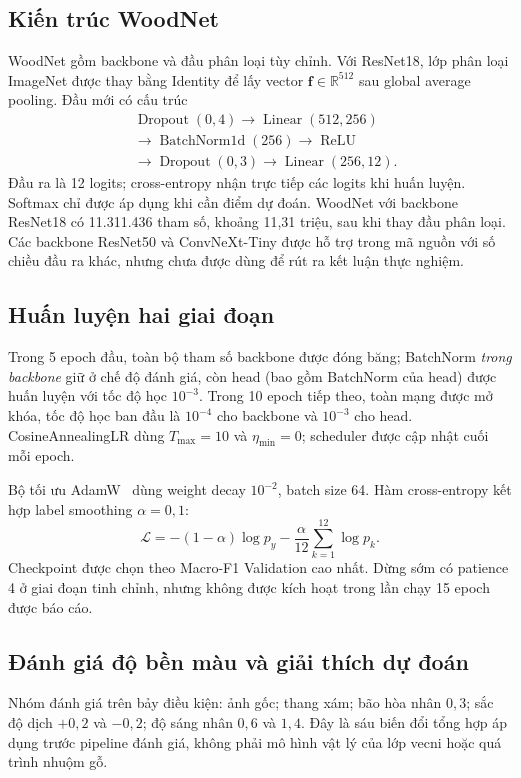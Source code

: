 \documentclass[conference]{IEEEtran}
\begin{document}
\subsection{Kiến trúc WoodNet}
WoodNet gồm backbone và đầu phân loại tùy chỉnh. Với ResNet18, lớp phân loại ImageNet được thay bằng Identity để lấy vector $\mathbf f\in\mathbb R^{512}$ sau global average pooling. Đầu mới có cấu trúc
\begin{equation}
\begin{split}
&\operatorname{Dropout}(0{,}4)\rightarrow\operatorname{Linear}(512,256)\\
&\rightarrow\operatorname{BatchNorm1d}(256)\rightarrow\operatorname{ReLU}\\
&\rightarrow\operatorname{Dropout}(0{,}3)\rightarrow\operatorname{Linear}(256,12).
\end{split}
\end{equation}
Đầu ra là 12 logits; cross-entropy nhận trực tiếp các logits khi huấn luyện. Softmax chỉ được áp dụng khi cần điểm dự đoán. WoodNet với backbone ResNet18 có 11.311.436 tham số, khoảng 11,31 triệu, sau khi thay đầu phân loại. Các backbone ResNet50 và ConvNeXt-Tiny được hỗ trợ trong mã nguồn với số chiều đầu ra khác, nhưng chưa được dùng để rút ra kết luận thực nghiệm.

\subsection{Huấn luyện hai giai đoạn}
Trong 5 epoch đầu, toàn bộ tham số backbone được đóng băng; BatchNorm \emph{trong backbone} giữ ở chế độ đánh giá, còn head (bao gồm BatchNorm của head) được huấn luyện với tốc độ học $10^{-3}$. Trong 10 epoch tiếp theo, toàn mạng được mở khóa, tốc độ học ban đầu là $10^{-4}$ cho backbone và $10^{-3}$ cho head. CosineAnnealingLR dùng $T_{\max}=10$ và $\eta_{\min}=0$; scheduler được cập nhật cuối mỗi epoch.

Bộ tối ưu AdamW~\cite{loshchilov2019decoupled} dùng weight decay $10^{-2}$, batch size 64. Hàm cross-entropy kết hợp label smoothing $\alpha=0{,}1$:
\begin{equation}
\mathcal L=-(1-\alpha)\log p_y-\frac{\alpha}{12}\sum_{k=1}^{12}\log p_k.
\end{equation}
Checkpoint được chọn theo Macro-F1 Validation cao nhất. Dừng sớm có patience 4 ở giai đoạn tinh chỉnh, nhưng không được kích hoạt trong lần chạy 15 epoch được báo cáo.

\subsection{Đánh giá độ bền màu và giải thích dự đoán}
Nhóm đánh giá trên bảy điều kiện: ảnh gốc; thang xám; bão hòa nhân $0{,}3$; sắc độ dịch $+0{,}2$ và $-0{,}2$; độ sáng nhân $0{,}6$ và $1{,}4$. Đây là sáu biến đổi tổng hợp áp dụng trước pipeline đánh giá, không phải mô hình vật lý của lớp vecni hoặc quá trình nhuộm gỗ.
\end{document}
